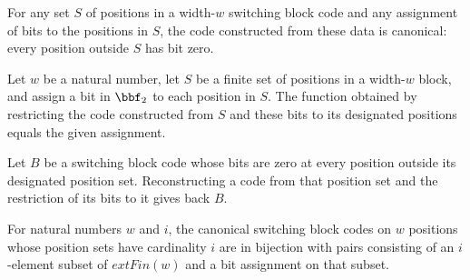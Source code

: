 \begin{theorem}
\label{FABL.SwitchingBlockCode.canonical_ofPositionBits}
\leanok
{}
For any set $S$ of positions in a width-$w$ switching block code and any assignment of
bits to the positions in $S$, the code constructed from these data is canonical: every
position outside $S$ has bit zero.
\end{theorem}

\begin{theorem}
\label{FABL.SwitchingBlockCode.restrictBits_ofPositionBits}
\leanok
{}
Let $w$ be a natural number, let $S$ be a finite set of positions in a width-$w$ block,
and assign a bit in $\bbf_2$ to each position in $S$. The function obtained by
restricting the code constructed from $S$ and these bits to its designated positions
equals the given assignment.
\end{theorem}

\begin{theorem}
\label{FABL.SwitchingBlockCode.ofPositionBits_restrictBits}
\leanok
{}
Let $B$ be a switching block code whose bits are zero at every position outside its
designated position set. Reconstructing a code from that position set and the
restriction of its bits to it gives back $B$.
\end{theorem}

\begin{definition}
\label{FABL.SwitchingBlockCode.finalOfSizeEquiv}
\leanok
{}
For natural numbers $w$ and $i$, the canonical switching block codes on $w$ positions
whose position sets have cardinality $i$ are in bijection with pairs consisting of an
$i$-element subset of $	ext{Fin}(w)$ and a bit assignment on that subset.
\end{definition}

